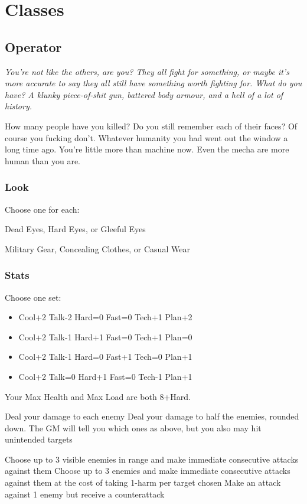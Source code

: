 \section{Classes}

\subsection{Operator}
{\itshape You're not like the others, are you? They all fight for something, or maybe it's more accurate to say they all still have something worth fighting for. What do you have? A klunky piece-of-shit gun, battered body armour, and a hell of a lot of history. 

How many people have you killed? Do you still remember each of their faces? Of course you fucking don't. Whatever humanity you had went out the window a long time ago. You're little more than machine now. Even the mecha are more human than you are.}

\subsubsection{Look}

Choose one for each:

Dead Eyes, Hard Eyes, or Gleeful Eyes

Military Gear, Concealing Clothes, or Casual Wear

\subsubsection{Stats}
Choose one set:
\begin{itemize}
\setlength\itemsep{0em}
\item Cool+2 Talk-2 Hard=0 Fast=0 Tech+1 Plan+2
\item Cool+2 Talk-1 Hard+1 Fast=0 Tech+1 Plan=0
\item Cool+2 Talk-1 Hard=0 Fast+1 Tech=0 Plan+1
\item Cool+2 Talk=0 Hard+1 Fast=0 Tech-1 Plan+1
\end{itemize}

Your Max Health and Max Load are both 8+Hard.

{Deal your damage to each enemy}
{Deal your damage to half the enemies, rounded down. The GM will tell you which ones}
{as above, but you also may hit unintended targets}

{Choose up to 3 visible enemies in range and make immediate consecutive attacks against them}
{Choose up to 3 enemies and make immediate consecutive attacks against them at the cost of taking 1-harm per target chosen}
{Make an attack against 1 enemy but receive a counterattack}

